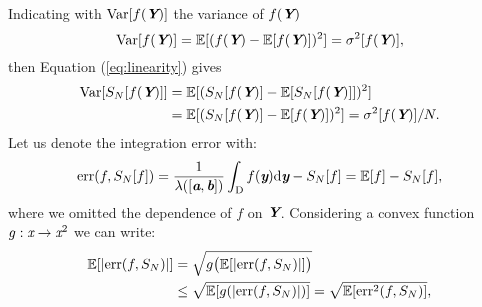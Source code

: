 Indicating with $\textrm{Var}[f(\textit{\textbf{Y}})]$ the variance of $f(\textit{\textbf{Y}})$
\begin{equation}\textrm{Var}[f(\textit{\textbf{Y}})]=\mathbb{E}[(f(\textit{\textbf{Y}})-\mathbb{E}[f(\textit{\textbf{Y}})])^2] = \sigma^2[f(\textit{\textbf{Y}})],
\end{equation}
then Equation (\ref{eq:linearity}) gives
\begin{equation}\label{eq:variance2}
\begin{aligned}
\textrm{Var}[S_N[f(\textit{\textbf{Y}})]] &= \mathbb{E}[(S_{N}[f(\textit{\textbf{Y}})]-\mathbb{E}[S_{N}[f(\textit{\textbf{Y}})]])^2]\\ &= \mathbb{E}[(S_{N}[f(\textit{\textbf{Y}})]-\mathbb{E}[f(\textit{\textbf{Y}})])^2] = \sigma^2[f(\textit{\textbf{Y}})]/N.
\end{aligned}
\end{equation}
Let us denote the integration error with:
\begin{equation}\label{eq:error1}
\textrm{err}(f, S_{N}[f]) =\frac{1}{\lambda([\textit{\textbf{a}},\textit{\textbf{b}}])}\int_{\textup{D}}f(\textit{\textbf{y}}) \textrm{d}\textit{\textbf{y}}-S_{N}[f] = \mathbb{E}[f]-S_N[f],
\end{equation}
where we omitted the dependence of $f$ on $\textit{\textbf{Y}}$.
Considering a convex function $g:\textit{x}\rightarrow\textit{x}^2$ we can write:
\begin{equation}
\begin{aligned}
\mathbb{E}[|\textrm{err}(f, S_{N})|] &= \sqrt{g\big(\mathbb{E}[|\textrm{err}(f, S_{N})|]\big)} \\&\leq\sqrt{\mathbb{E}[g(|\textrm{err}(f, S_{N})|)]} = \sqrt{\mathbb{E}[\textrm{err}^2(f, S_{N})]},
\end{aligned}
\end{equation} 
